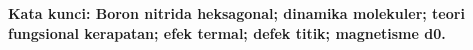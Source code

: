 
\vspace{5mm}

\noindent \textbf{Kata kunci: Boron nitrida heksagonal; dinamika molekuler; teori fungsional kerapatan; efek termal; defek titik; magnetisme d0.} \textit{} %

\newpage

